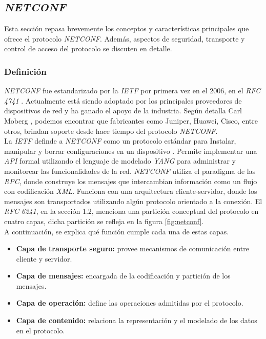 \subsection{\textit{NETCONF}}
Esta sección repasa brevemente los conceptos y características principales que ofrece el protocolo \textit{NETCONF}. Además, aspectos de seguridad, transporte y control de acceso del protocolo se discuten en detalle. 

\subsubsection{Definición}
\textit{NETCONF} fue estandarizado por la \textit{IETF} por primera vez en el 2006, en el \textit{RFC 4741} \parencite{netconfrfc}. Actualmente está siendo adoptado por los principales proveedores de dispositivos de red y ha ganado el apoyo de la industria. Según detalla Carl Moberg \parencite{netconfusos}, podemos encontrar que fabricantes como Juniper, Huawei, Cisco, entre otros, brindan soporte desde hace tiempo del protocolo \textit{NETCONF}. 
\\

La \textit{IETF} definde a \textit{NETCONF} como un protocolo estándar para Instalar, manipular y borrar configuraciones en un dispositivo \parencite{netconfrfcnuevo}. Permite implementar una \textit{API} formal utilizando el lenguaje de modelado \textit{YANG} para administrar y monitorear las funcionalidades de la red. \textit{NETCONF} utiliza el paradigma de las \textit{RPC}, donde construye los mensajes que intercambian información como un flujo con codificación \textit{XML}. Funciona con una arquitectura cliente-servidor, donde los mensajes son transportados utilizando algún protocolo orientado a la conexión. El \textit{RFC 6241}, en la sección 1.2, menciona una partición conceptual del protocolo en cuatro capas, dicha partición se refleja en la figura \ref{fig:netconf}. 
\\

A continuación, se explica qué función cumple cada una de estas capas.

\begin{itemize}
	\item \textbf{Capa de transporte seguro:} provee mecanismos de comunicación entre cliente y servidor.  
	\item \textbf{Capa de mensajes:} encargada de la codificación y partición de los mensajes.  
	\item \textbf{Capa de operación:} define las operaciones admitidas por el protocolo.
	\item \textbf{Capa de contenido:} relaciona la representación y el modelado de los datos en el protocolo.    
\end{itemize}

